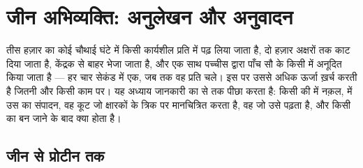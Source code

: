 \chapter{जीन अभिव्यक्ति: अनुलेखन और अनुवादन}\label{ch:b1:gene-expression}

तीस हज़ार  का कोई  चौथाई घंटे में किसी कार्यशील प्रति
में पढ़ लिया जाता है, दो हज़ार अक्षरों तक काट दिया जाता है, केंद्रक से
बाहर भेजा जाता है, और एक साथ पच्चीस  द्वारा पाँच सौ  के किसी  में अनूदित किया जाता है --- हर चार सेकंड में एक,
जब तक वह प्रति चले।  इस पर उससे अधिक ऊर्जा ख़र्च करती है जितनी और
किसी काम पर। यह अध्याय जानकारी का  से  तक पीछा करता है: किसी
 की  में नक़ल,  में उस  का संपादन, वह कूट जो
क्षारकों के त्रिक  पर मानचित्रित करता है, वह  जो उसे
पढ़ता है, और किसी  का बन जाने के बाद क्या होता है।

\section{जीन से प्रोटीन तक}

